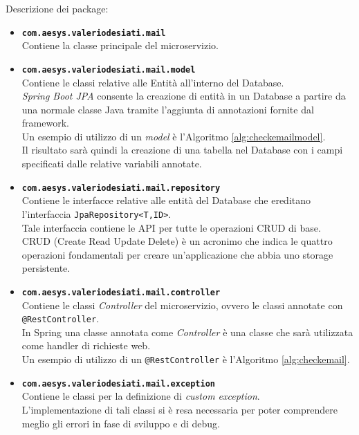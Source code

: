 Descrizione dei package:
\begin{itemize}
	\item \textbf{\texttt{com.aesys.valeriodesiati.mail}}\\ Contiene la classe principale del microservizio.
	\item \textbf{\texttt{com.aesys.valeriodesiati.mail.model}}\\ Contiene le classi relative alle Entità all'interno del Database.\\ \emph{Spring Boot JPA} consente la creazione di entità in un Database a partire da una normale classe Java tramite l'aggiunta di annotazioni fornite dal framework.\\Un esempio di utilizzo di un \emph{model} è l'Algoritmo \ref{alg:checkemailmodel}.\\Il risultato sarà quindi la creazione di una tabella nel Database con i campi specificati dalle relative variabili annotate.
	\item \textbf{\texttt{com.aesys.valeriodesiati.mail.repository}}\\ Contiene le interfacce relative alle entità del Database che ereditano l'interfaccia \texttt{JpaRepository<T,ID>}.\\ Tale interfaccia contiene le API per tutte le operazioni CRUD di base.\\ CRUD (Create Read Update Delete) è un acronimo che indica le quattro operazioni fondamentali per creare un'applicazione che abbia uno storage persistente.
	\item \textbf{\texttt{com.aesys.valeriodesiati.mail.controller}}\\ Contiene le classi \emph{Controller} del microservizio, ovvero le classi annotate con \texttt{@RestController}.\\ In Spring una classe annotata come \emph{Controller} è una classe che sarà utilizzata come handler di richieste web.\\Un esempio di utilizzo di un \texttt{@RestController} è l'Algoritmo \ref{alg:checkemail}.
	\item \textbf{\texttt{com.aesys.valeriodesiati.mail.exception}}\\ Contiene le classi per la definizione di \emph{custom exception}.\\ L'implementazione di tali classi si è resa necessaria per poter comprendere meglio gli errori in fase di sviluppo e di debug.\\
\end{itemize}

